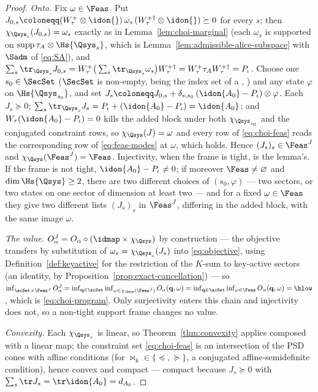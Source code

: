 \begin{proof}
\emph{Onto.} Fix $\omega\in\Feas$. Put
$J_{0,s}\coloneqq(W_{\tau}^{+}\otimes\idon{})\,\omega_s\,
(W_{\tau}^{+\dagger}\otimes\idon{})\succeq0$ for every $s$; then
$\chi_{\Qsys_s}(J_{0,s})=\omega_s$ exactly as in
Lemma~\ref{lem:choi-marginal} (each $\omega_s$ is supported on
$\operatorname{supp}\tau_A\otimes\Hs{\Qsys_s}$, which is
Lemma~\ref{lem:admissible-alice-subspace} with $\Sadm$ of \eqref{eq:SA}), and
$\sum_s\tr_{\Qsys_s}J_{0,s}
=W_{\tau}^{+}\big(\sum_s\tr_{\Qsys_s}\omega_s\big)W_{\tau}^{+\dagger}
=W_{\tau}^{+}\tau_AW_{\tau}^{+\dagger}=P_{\iota}$. Choose one
$s_0\in\SecSet$ ($\SecSet$ is non-empty, being the index set of a ,
) and any
state $\varphi$ on $\Hs{\Qsys_{s_0}}$, and set
$J_s\coloneqq J_{0,s}+\delta_{s,s_0}\,(\idon{A_0}-P_{\iota})
\otimes\varphi$. Each $J_s\succeq0$;
$\sum_s\tr_{\Qsys_s}J_s=P_{\iota}+(\idon{A_0}-P_{\iota})=\idon{A_0}$; and
$W_{\tau}(\idon{A_0}-P_{\iota})=0$ kills the added block under both
$\chi_{\Qsys_{s_0}}$ and the conjugated constraint rows, so
$\chi_{\Qsys}(J)=\omega$ and every row of \eqref{eq:choi-feas} reads the
corresponding row of \eqref{eq:feas-modes} at $\omega$, which holds.
Hence $(J_s)_s\in\Feas^{J}$ and $\chi_{\Qsys}(\Feas^{J})=\Feas$.
Injectivity, when the frame is tight, is the lemma's. If the frame is not
tight, $\idon{A_0}-P_{\iota}\ne0$; if moreover $\Feas\ne\varnothing$ and
$\dim\Hs{\Qsys}\ge2$, there are two different choices of $(s_0,\varphi)$ ---
two sectors, or two states on one sector of dimension at least two --- and
for a fixed $\omega\in\Feas$ they give two different lists $(J_s)_s$ in
$\Feas^{J}$, differing in the added block, with the same image $\omega$.

\emph{The value.} $O^{J}_{\alpha}=O_{\alpha}\circ(\idmap\times
\chi_{\Qsys})$ by construction --- the objective transfers by
substitution of $\omega_s=\chi_{\Qsys_s}(J_s)$ into
\eqref{eq:objective}, using Definition~\ref{def:keyactive} for the
restriction of the $K$-sum to key-active sectors (an identity, by
Proposition~\ref{prop:exact-cancellation}) --- so
$\inf_{\acSet\times\Feas^{J}}O^{J}_{\alpha}
=\inf_{\mathbf q\in\acSet}\inf_{\omega\in\chi_{\Qsys}(\Feas^{J})}
O_{\alpha}(\mathbf q,\omega)
=\inf_{\mathbf q\in\acSet}\inf_{\omega\in\Feas}O_{\alpha}(\mathbf q,\omega)
=\hlow$, which is \eqref{eq:choi-program}. Only surjectivity enters this
chain and injectivity does not, so a non-tight support frame changes no
value.

\emph{Convexity.} Each $\chi_{\Qsys_s}$ is linear, so
Theorem~\ref{thm:convexity} applies composed with a linear map; the
constraint set \eqref{eq:choi-feas} is an intersection of the PSD cones
with affine conditions (for $\bowtie_k\in\{\preceq,\succeq\}$, a
conjugated affine-semidefinite condition), hence convex and compact ---
compact because $J_s\succeq0$ with
$\sum_s\tr J_s=\tr\idon{A_0}=d_{A_0}$.


\end{proof}
